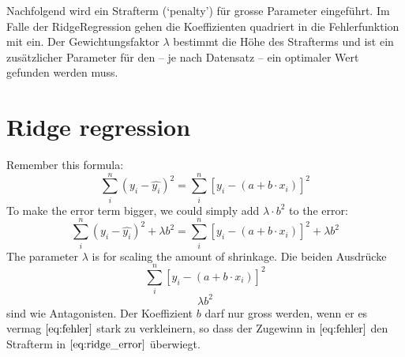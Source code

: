 \documentclass[letterpaper,10pt,english]{jupyterBook}
\begin{document}
\sphinxAtStartPar
Nachfolgend wird ein Strafterm (‘penalty’) für grosse Parameter eingeführt. Im Falle der Ridge\sphinxhyphen{}Regression gehen die Koeffizienten quadriert in die Fehlerfunktion mit ein. Der Gewichtungsfaktor \(\lambda\) bestimmt die Höhe des Strafterms und ist ein zusätzlicher Parameter für den – je nach Datensatz – ein optimaler Wert gefunden werden muss.


\section{Ridge regression}
\label{\detokenize{Regression_Techniques:ridge-regression}}
\sphinxAtStartPar
Remember this formula:
\begin{equation*}\sum_i^{n}(y_i - \hat{y_i})^2 = \sum_i^{n}[y_i - (a + b\cdot x_i)]^{2}\end{equation*}
\sphinxAtStartPar
To make the error term bigger, we could simply add \(\lambda\cdot b^2\) to the error:
\begin{equation*}\sum_i^{n}(y_i - \hat{y_i})^2 + \lambda b^2= \sum_i^{n}[y_i - (a + b\cdot x_i)]^{2}+ \lambda b^2\end{equation*}
\sphinxAtStartPar
The parameter \(\lambda\) is for scaling the amount of shrinkage.
Die beiden Ausdrücke
\label{equation:Regression_Techniques:9e0ee006-233d-4001-a276-fead6aca26e3}\begin{equation}\sum_i^{n}[y_i - (a + b\cdot x_i)]^{2}\label{eq:fehler}\end{equation}\label{equation:Regression_Techniques:e9db3919-f45d-4421-9301-62a089f9975c}\begin{equation}\lambda b^2\label{eq:ridge_error}\end{equation}
\sphinxAtStartPar
sind wie Antagonisten. Der Koeffizient \(b\) darf nur gross werden, wenn er es vermag \(\eqref{eq:fehler}\) stark zu verkleinern, so dass der Zugewinn in \(\eqref{eq:fehler}\) den Strafterm in \(\eqref{eq:ridge_error}\) überwiegt.
\end{document}
